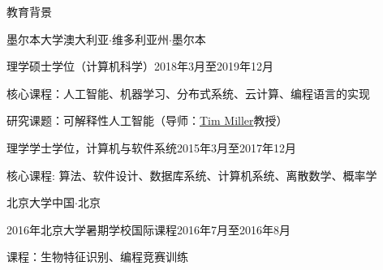 \documentclass{xsha}
\begin{document}
\address{
\textbf{电话号码} +86 136******** $\cdot$\space
\textbf{电子邮箱} \href{mailto:luo@jiahai.co}{luo@jiahai.co} $\cdot$\space
\textbf{领英} \href{https://linkedin.com/in/luojiahai/}{in/luojiahai} $\cdot$\space
\textbf{GitHub} \href{https://github.com/luojiahai/}{luojiahai} $\cdot$\space
\textbf{个人网站} \href{https://luojiahai.com/}{luojiahai.com}
}

\begin{xsection}{教育背景}

\begin{xheading}{墨尔本大学}{澳大利亚$\cdot$维多利亚州$\cdot$墨尔本}
\begin{xsubheading}{理学硕士学位（计算机科学）}{2018年3月至2019年12月}
\item 核心课程：人工智能、机器学习、分布式系统、云计算、编程语言的实现
\item 研究课题：可解释性人工智能（导师：\href{https://eecs.uq.edu.au/profile/9477/tim-miller}{Tim Miller}教授）
\end{xsubheading}
\begin{xsubheading}{理学学士学位，计算机与软件系统}{2015年3月至2017年12月}
\item 核心课程: 算法、软件设计、数据库系统、计算机系统、离散数学、概率学
\end{xsubheading}
\end{xheading}

\begin{xheading}{北京大学}{中国$\cdot$北京}
\begin{xsubheading}{2016年北京大学暑期学校国际课程}{2016年7月至2016年8月}
\item 课程：生物特征识别、编程竞赛训练
\end{xsubheading}
\end{xheading}

\end{xsection}
\end{document}
